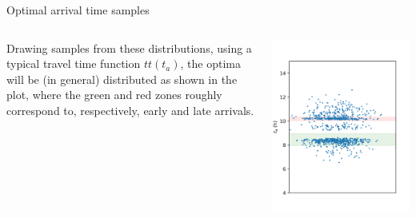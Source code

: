 \documentclass{beamer}
\begin{document}
\begin{frame}{Optimal arrival time samples}
  
  \begin{columns}
      Drawing samples from these distributions, using a typical travel time function \(tt(t_a)\), the optima will be (in general) distributed as shown in the plot,
      where the green and red zones roughly correspond to, respectively, early and late arrivals.

    \centering
      \includegraphics[width=\textwidth]{t_as}
  \end{columns}
\end{frame}
\end{document}
